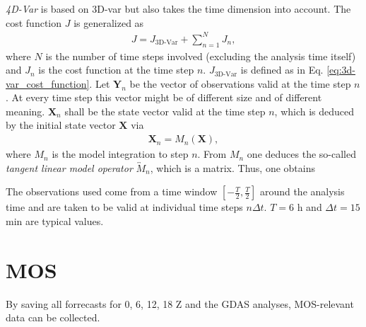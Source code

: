 \documentclass{article}
\begin{document}
\textit{4D-Var} is based on 3D-var but also takes the time dimension into account. The cost function $J$ is generalized as
%
\begin{eqnarray}
J = J_{\text{3D-Var}} + \sum_{n = 1}^NJ_n,
\end{eqnarray}
%
where $N$ is the number of time steps involved (excluding the analysis time itself) and $J_n$ is the cost function at the time step $n$. $J_{\text{3D-Var}}$ is defined as in Eq. \eqref{eq:3d-var_cost_function}. Let $\mathbf{Y}_n$ be the vector of observations valid at the time step $n$. At every time step this vector might be of different size and of different meaning. $\mathbf{X}_n$ shall be the state vector valid at the time step $n$, which is deduced by the initial state vector $\mathbf{X}$ via
%
\begin{eqnarray}
\mathbf{X}_n = M_n\left(\mathbf{X}\right),
\end{eqnarray}
%
where $M_n$ is the model integration to step $n$. From $M_n$ one deduces the so-called \textit{tangent linear model operator} $\overleftrightarrow{M}_n$, which is a matrix. Thus, one obtains
%
\begin{center}
\end{center}
%
The observations used come from a time window $\left[-\frac{T}{2}, \frac{T}{2}\right]$ around the analysis time and are taken to be valid at individual time steps $n\Delta t$. $T = 6$ h and $\Delta t = 15$ min are typical values.

\section{MOS}
\label{sec:mos}

By saving all forrecasts for 0, 6, 12, 18 Z and the GDAS analyses, MOS-relevant data can be collected.

\appendix
\end{document}
